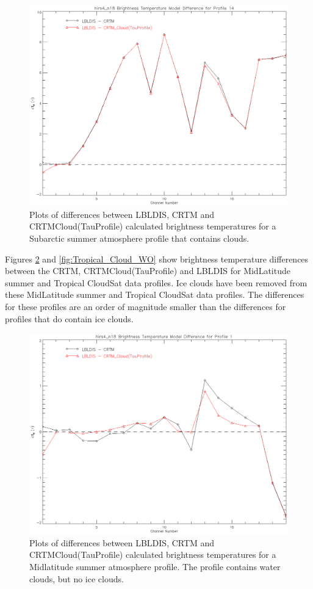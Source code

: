 \begin{figure}[htp]
  \centering{}
  \includegraphics[scale=0.8]{./graphics/SubArctic_Clouds_14.eps}
  \caption{Plots of differences between LBLDIS, CRTM and CRTM\textunderscore{}Cloud(TauProfile) calculated brightness temperatures for 
   a Subarctic summer atmosphere profile that contains clouds.}
  \label{fig:SubArctic_Cloud}
\end{figure} 


\newpage{}
Figures \ref{fig:MidLat_Cloud_WO} and \ref{fig:Tropical_Cloud_WO} show brightness temperature differences between the CRTM, CRTM\textunderscore{}Cloud(TauProfile) and LBLDIS for MidLatitude summer and Tropical CloudSat data profiles. Ice clouds have been
removed from these MidLatitude summer and Tropical CloudSat data profiles. The differences for these profiles are an order of magnitude
smaller than the differences for profiles that do contain ice clouds.
\newpage{}
\begin{figure}[htp]
  \centering{}
  \includegraphics[scale=0.8]{./graphics/Midlatitude_Clouds_WO_01.eps}
  \caption{Plots of differences between LBLDIS, CRTM and CRTM\textunderscore{}Cloud(TauProfile) calculated brightness temperatures for 
   a Midlatitude summer atmosphere profile. The profile contains water clouds, but no ice clouds.}
  \label{fig:MidLat_Cloud_WO}
\end{figure}

